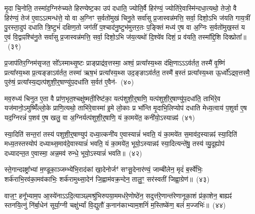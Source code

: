 मृ॒दा चि॒नोति॒ तस्मा॑द॒ग्निरु॑च्यते हिरण्येष्ट॒का उप॑ दधाति॒ ज्योति॒र्वै हिर॑ण्यं॒ ज्योति॑रे॒वास्मि॑न्दधा॒त्यथो॒ तेजो॒ वै हिर॑ण्यं॒ तेज॑ ए॒वा\-ऽऽ\-त्मन्ध॑त्ते॒ यो वा अ॒ग्निꣳ स॒र्वतो॑मुखं चिनु॒ते सर्वा॑सु प्र॒जास्वन्न॑मत्ति॒ सर्वा॒ दिशो॒\-ऽभि ज॑यति गाय॒त्रीं पु॒रस्ता॒दुप॑ दधाति त्रि॒ष्टुभं॑ दक्षिण॒तो जग॑तीं प॒श्चाद॑नु॒ष्टुभ॑मुत्तर॒तः प॒ङ्क्तिं मध्य॑ ए॒ष वा अ॒ग्निः स॒र्वतो॑मुख॒स्तं य ए॒वं वि॒द्वाꣴश्चि॑नु॒ते सर्वा॑सु प्र॒जास्वन्न॑मत्ति॒ सर्वा॒ दिशो॒\-ऽभि ज॑य॒त्यथो॑ दि॒श्ये॑व दिशं॒ प्र व॑यति॒ तस्मा᳚द्\-दि॒शि दिक्प्रोता᳚॥~(३९)\ip

{\anuvakamend[{अपि॑ सं॒ यौति॑ वैश्वान॒रो यदे॒ष वै पञ्च॑विꣳशतिश्च}]}

प्र॒जा\-प॑तिर॒ग्निम॑सृजत॒ सो᳚\-ऽस्माथ्सृ॒ष्टः प्राङ्प्राद्र॑व॒त्तस्मा॒ अश्वं॒ प्रत्या᳚स्य॒थ्स द॑क्षि॒णा\-ऽऽ\-ऽव॑र्तत॒ तस्मै॑ वृ॒ष्णिं प्रत्या᳚स्य॒थ्स प्र॒त्यङ्ङा\-ऽव॑र्तत॒ तस्मा॑ ऋष॒भं प्रत्या᳚स्य॒थ्स उद॒ङ्ङा\-ऽव॑र्तत॒ तस्मै॑ ब॒स्तं प्रत्या᳚स्य॒थ्स ऊ॒र्ध्वो᳚\-ऽद्रव॒त्तस्मै॒ पुरु॑षं॒ प्रत्या᳚स्य॒द्यत्प॑शुशी॒र्॒\mbox{}षाण्यु॑प॒\-दधा॑ति स॒र्वत॑ ए॒वैन॑-~(४०)\ip

मव॒रुध्य॑ चिनुत ए॒ता वै प्रा॑ण॒भृत॒श्चक्षु॑ष्मती॒रिष्ट॑का॒ यत्प॑शुशी॒र्॒\mbox{}षाणि॒ यत्प॑शुशी॒र्॒\mbox{}षाण्यु॑प॒\-दधा॑ति॒ ताभि॑रे॒व यज॑मानो॒\-ऽमुष्मिँ॑ल्लो॒के प्राणि॒त्यथो॒ ताभि॑रे॒वास्मा॑ इ॒मे लो॒काः प्र भा᳚न्ति मृ॒दाभि॒लिप्योप॑ दधाति मेध्य॒त्वाय॑ प॒शुर्वा ए॒ष यद॒ग्निरन्नं॑ प॒शव॑ ए॒ष खलु॒ वा अ॒ग्निर्यत्प॑शुशी॒र्॒\mbox{}षाणि॒ यं का॒मये॑त॒ कनी॑यो॒\-ऽस्यान्नꣴ॑~(४१)\ip

स्या॒दिति॑ सन्त॒रां तस्य॑ पशुशी॒र्॒\mbox{}षाण्युप॑ दध्या॒त्कनी॑य ए॒वास्यान्नं॑ भवति॒ यं का॒मये॑त स॒माव॑द॒स्यान्नꣴ॑ स्या॒दिति॑ मध्य॒तस्तस्योप॑ दध्याथ्स॒माव॑दे॒वास्यान्नं॑ भवति॒ यं का॒मये॑त॒ भूयो॒\-ऽस्यान्नꣴ॑ स्या॒दित्यन्ते॑षु॒ तस्य॑ व्यु॒दूह्योप॑ दध्यादन्त॒त ए॒वास्मा॒ अन्न॒मव॑ रुन्धे॒ भूयो॒\-ऽस्यान्नं॑ भवति॥~(४२)\ip

{\anuvakamend[{ए॒न॒म॒स्यान्न॒म्भूयो॒स्यान्नं॑ भवति}]}%

स्ते॒गान्दꣴष्ट्रा᳚भ्यां म॒ण्डूका॒ञ्जम्भ्ये॑भि॒राद॑कां खा॒देनोर्जꣳ॑ सꣳसू॒देनार॑ण्यं॒ जाम्बी॑लेन॒ मृदं॑ ब॒र्स्वे॑भिः॒ शर्क॑राभि॒रव॑का॒मव॑काभिः॒ शर्क॑रामुथ्सा॒देन॑ जि॒ह्वाम॑वक्र॒न्देन॒ तालु॒ꣳ॒ सर॑स्वतीं जिह्वा॒ग्रेण॑॥~(४३)\ip

{\anuvakamend[{स्ते॒गान्द्वाविꣳ॑शतिः}]}%

वाज॒ꣳ॒ हनू᳚भ्याम॒प आ॒स्ये॑ना\-ऽऽदि॒त्याञ्छ्मश्रु॑भिरुपया॒ममध॑रे॒णोष्ठे॑न॒ सदुत्त॑रे॒णान्त॑रेणा\-नूका॒शं प्र॑का॒शेन॒ बाह्यꣴ॑ स्तनयि॒त्नुं नि॑र्बा॒धेन॑ सूर्या॒ग्नी चक्षु॑र्भ्यां वि॒द्युतौ॑ क॒नान॑काभ्याम॒शनिं॑ म॒स्तिष्के॑ण॒ बलं॑ म॒ज्जभिः॑॥~(४४)\ip

